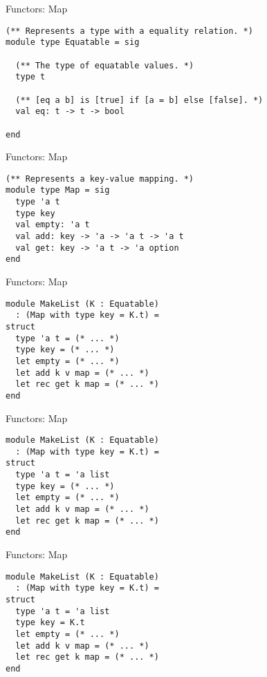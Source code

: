 \documentclass{beamer}
\begin{document}
    \begin{frame}[fragile=singleslide]{Functors: Map}
        \begin{verbatim}
(** Represents a type with a equality relation. *)
module type Equatable = sig

  (** The type of equatable values. *)
  type t

  (** [eq a b] is [true] if [a = b] else [false]. *)
  val eq: t -> t -> bool

end
        \end{verbatim}
    \end{frame}

    \begin{frame}[fragile=singleslide]{Functors: Map}
        \begin{verbatim}
(** Represents a key-value mapping. *)
module type Map = sig
  type 'a t
  type key
  val empty: 'a t
  val add: key -> 'a -> 'a t -> 'a t
  val get: key -> 'a t -> 'a option
end
        \end{verbatim}
    \end{frame}

    \begin{frame}[fragile=singleslide]{Functors: Map}
        \begin{verbatim}
module MakeList (K : Equatable)
  : (Map with type key = K.t) =
struct
  type 'a t = (* ... *)
  type key = (* ... *)
  let empty = (* ... *)
  let add k v map = (* ... *)
  let rec get k map = (* ... *)
end
        \end{verbatim}
    \end{frame}

    \begin{frame}[fragile=singleslide]{Functors: Map}
        \begin{verbatim}
module MakeList (K : Equatable)
  : (Map with type key = K.t) =
struct
  type 'a t = 'a list
  type key = (* ... *)
  let empty = (* ... *)
  let add k v map = (* ... *)
  let rec get k map = (* ... *)
end
        \end{verbatim}
    \end{frame}

    \begin{frame}[fragile=singleslide]{Functors: Map}
        \begin{verbatim}
module MakeList (K : Equatable)
  : (Map with type key = K.t) =
struct
  type 'a t = 'a list
  type key = K.t
  let empty = (* ... *)
  let add k v map = (* ... *)
  let rec get k map = (* ... *)
end
        \end{verbatim}
    \end{frame}
\end{document}
